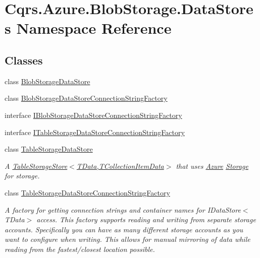 \hypertarget{namespaceCqrs_1_1Azure_1_1BlobStorage_1_1DataStores}{}\section{Cqrs.\+Azure.\+Blob\+Storage.\+Data\+Stores Namespace Reference}
\label{namespaceCqrs_1_1Azure_1_1BlobStorage_1_1DataStores}
\subsection*{Classes}
\begin{DoxyCompactItemize}
\item 
class \hyperlink{classCqrs_1_1Azure_1_1BlobStorage_1_1DataStores_1_1BlobStorageDataStore}{Blob\+Storage\+Data\+Store}
\item 
class \hyperlink{classCqrs_1_1Azure_1_1BlobStorage_1_1DataStores_1_1BlobStorageDataStoreConnectionStringFactory}{Blob\+Storage\+Data\+Store\+Connection\+String\+Factory}
\item 
interface \hyperlink{interfaceCqrs_1_1Azure_1_1BlobStorage_1_1DataStores_1_1IBlobStorageDataStoreConnectionStringFactory}{I\+Blob\+Storage\+Data\+Store\+Connection\+String\+Factory}
\item 
interface \hyperlink{interfaceCqrs_1_1Azure_1_1BlobStorage_1_1DataStores_1_1ITableStorageDataStoreConnectionStringFactory}{I\+Table\+Storage\+Data\+Store\+Connection\+String\+Factory}
\item 
class \hyperlink{classCqrs_1_1Azure_1_1BlobStorage_1_1DataStores_1_1TableStorageDataStore}{Table\+Storage\+Data\+Store}
\begin{DoxyCompactList}\small\item\em A \hyperlink{classCqrs_1_1Azure_1_1BlobStorage_1_1TableStorageStore_aabc36bc46ffb22b716cc7769a641cfab_aabc36bc46ffb22b716cc7769a641cfab}{Table\+Storage\+Store$<$\+T\+Data,\+T\+Collection\+Item\+Data$>$} that uses \hyperlink{namespaceCqrs_1_1Azure}{Azure} \hyperlink{namespaceCqrs_1_1Azure_1_1Storage}{Storage} for storage. \end{DoxyCompactList}\item 
class \hyperlink{classCqrs_1_1Azure_1_1BlobStorage_1_1DataStores_1_1TableStorageDataStoreConnectionStringFactory}{Table\+Storage\+Data\+Store\+Connection\+String\+Factory}
\begin{DoxyCompactList}\small\item\em A factory for getting connection strings and container names for I\+Data\+Store$<$\+T\+Data$>$ access. This factory supports reading and writing from separate storage accounts. Specifically you can have as many different storage accounts as you want to configure when writing. This allows for manual mirroring of data while reading from the fastest/closest location possible. \end{DoxyCompactList}\end{DoxyCompactItemize}
